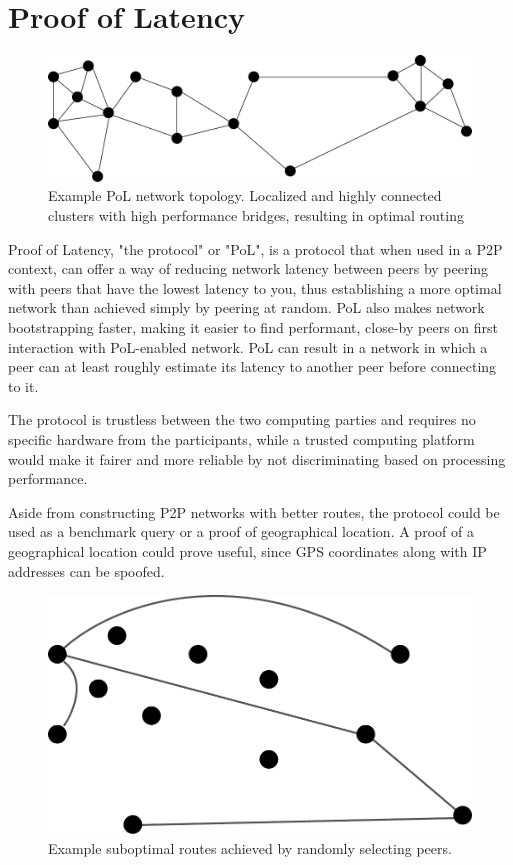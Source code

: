 \chapter{Proof of Latency}
\label{Proof of Latency}
\begin{figure}
	\includegraphics[width=\textwidth]{pictures/pol_topology.pdf}
	\caption{Example PoL network topology. Localized and highly connected clusters with high performance bridges, resulting in optimal routing}
	\label{PoL Example Topology}
\end{figure}

Proof of Latency, "the protocol" or "PoL", is a protocol that when used in a P2P context, can offer a way of reducing network latency between peers by peering with peers that have the lowest latency to you, thus establishing a more optimal network than achieved simply by peering at random. PoL also makes network bootstrapping faster, making it easier to find performant, close-by peers on first interaction with PoL-enabled network. PoL can result in a network in which a peer can at least roughly estimate its latency to another peer before connecting to it.

The protocol is trustless between the two computing parties and requires no specific hardware from the participants, while a trusted computing platform would make it fairer and more reliable by not discriminating based on processing performance.

Aside from constructing P2P networks with better routes, the protocol could be used as a benchmark query or a proof of geographical location. A proof of a geographical location could prove useful, since GPS coordinates along with IP addresses can be spoofed.

\begin{figure}
	\includegraphics[width=\textwidth]{pictures/random_routing.pdf}
	\caption{Example suboptimal routes achieved by randomly selecting peers.}
	\label{Subobtimal Topology}
\end{figure}

